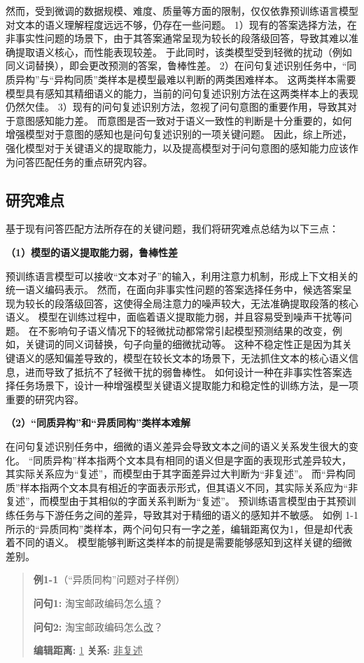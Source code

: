 然而，受到微调的数据规模、难度、质量等方面的限制，仅仅依靠预训练语言模型对文本的语义理解程度远远不够，仍存在一些问题。
1）现有的答案选择方法，在非事实性问题的场景下，由于其答案通常呈现为较长的段落级回答，导致其难以准确提取语义核心，而性能表现较差。
于此同时，该类模型受到轻微的扰动（例如同义词替换），即会更改预测的答案，鲁棒性差。
2）在问句复述识别任务中，“同质异构”与“异构同质”类样本是模型最难以判断的两类困难样本。
这两类样本需要模型具有感知其精细语义的能力，当前的问句复述识别方法在这两类样本上的表现仍然欠佳。
3）现有的问句复述识别方法，忽视了问句意图的重要作用，导致其对于意图感知能力差。
而意图是否一致对于语义一致性的判断是十分重要的，如何增强模型对于意图的感知也是问句复述识别的一项关键问题。
因此，综上所述，强化模型对于关键语义的提取能力，以及提高模型对于问句意图的感知能力应该作为问答匹配任务的重点研究内容。


\subsection{研究难点}

基于现有问答匹配方法所存在的关键问题，我们将研究难点总结为以下三点：

\textbf{\songti （1）模型的语义提取能力弱，鲁棒性差}

预训练语言模型可以接收“文本对子”的输入，利用注意力机制，形成上下文相关的统一语义编码表示。
然而，在面向非事实性问题的答案选择任务中，候选答案呈现为较长的段落级回答，这使得全局注意力的噪声较大，无法准确提取段落的核心语义。
模型在训练过程中，面临着语义提取能力弱，并且容易受到噪声干扰等问题。
在不影响句子语义情况下的轻微扰动都常常引起模型预测结果的改变，例如，关键词的同义词替换，句子向量的细微扰动等。
这种不稳定性正是因为其关键语义的感知偏差导致的，模型在较长文本的场景下，无法抓住文本的核心语义信息，进而导致了抵抗不了轻微干扰的弱鲁棒性。
如何设计一种在非事实性答案选择任务场景下，设计一种增强模型关键语义提取能力和稳定性的训练方法，是一项重要的研究内容。


\textbf{\songti （2）“同质异构”和“异质同构”类样本难解}

在问句复述识别任务中，细微的语义差异会导致文本之间的语义关系发生很大的变化。
“同质异构”样本指两个文本具有相同的语义但是字面的表现形式差异较大，其实际关系应为“复述”，而模型由于其字面差异过大判断为“非复述”。
而“异构同质”样本指两个文本具有相近的字面表示形式，但其语义不同，其实际关系应为“非复述”，而模型由于其相似的字面关系判断为“复述”。
预训练语言模型由于其预训练任务与下游任务之间的差异，导致其对于精细的语义的感知并不敏感。
如例 1-1 所示的“异质同构”类样本，两个问句只有一字之差，编辑距离仅为1，但是却代表着不同的语义。
模型能够判断这类样本的前提是需要能够感知到这样关键的细微差别。
\begin{quotation}
    \noindent \textbf{\songti 例1-1}（“异质同构”问题对子样例）
    
    \noindent \textbf{问句1:} 淘宝邮政编码怎么\underline{填}？
    
    \noindent \textbf{问句2:} 淘宝邮政编码怎么\underline{改}？
    
    \noindent \textbf{编辑距离:} \underline{1} \qquad \textbf{关系:} \underline{非复述}
    
\end{quotation}

